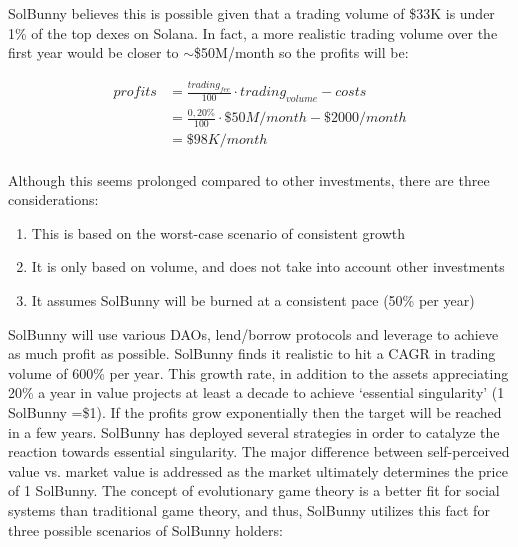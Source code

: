 \documentclass[12pt]{article}
\begin{document}
SolBunny believes this is possible given that a trading volume of \$33K is under 1\% of the top dexes on Solana. In fact, a more realistic trading volume over the first year would be closer to $\sim$\$50M/month so the profits will be:
 
\begin{equation}\label{income by 10x}
\begin{split}
profits &=\frac{trading_{fee}}{100}  \cdot trading_{volume} - costs\\
 &=\frac{0,20\%}{100} \cdot \$50M/month - \$2000/month\\
 &=\$98K/month
\end{split}
\end{equation}
\\


Although this seems prolonged compared to other investments, there are three considerations:

\begin{enumerate}[label=(\roman*)]

\item This is based on the worst-case scenario of consistent growth

\item It is only based on volume, and does not take into account other investments

\item It assumes SolBunny will be burned at a consistent pace (50\% per year)\\

\end{enumerate}


SolBunny will use various DAOs, lend/borrow protocols and leverage to achieve as much profit as possible. SolBunny finds it realistic to hit a CAGR in trading volume of 600\% per year. This growth rate, in addition to the assets appreciating 20\% a year in value projects  at least a decade to achieve ‘essential singularity’ (1 SolBunny =\$1). If the profits grow exponentially then the target will be reached in a few years. SolBunny has deployed several strategies in order to catalyze the reaction towards essential singularity. The major difference between self-perceived value vs. market value is addressed as the market ultimately determines the price of 1 SolBunny. The concept of evolutionary game theory \cite{egt} is a better fit for social systems than traditional game theory, and thus, SolBunny utilizes this fact for three possible scenarios of SolBunny holders:
\end{document}
